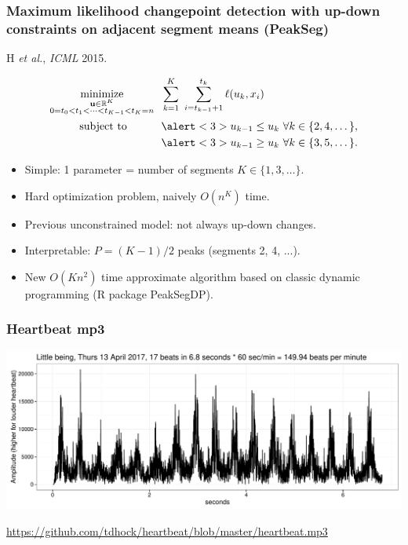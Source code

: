\documentclass{beamer}
\DeclareMathOperator*{\minimize}{minimize}
\newcommand{\RR}{\mathbb R}
\begin{document}
\begin{frame}
  \frametitle{Maximum likelihood changepoint detection with up-down constraints on adjacent segment means (PeakSeg)}
H {\it et al.}, {\it ICML} 2015. 
   
\vskip -1.5cm
\begin{align*}
    \minimize_{\substack{
  \mathbf u\in\RR^{K}
\\
   0=t_0<t_1<\cdots<t_{K-1}<t_K=n
  }} &\ \ 
    \sum_{k=1}^K\  \sum_{i=t_{k-1}+1}^{t_k} \ell( u_k,  x_i) 
  \label{PeakSegPDPA}
\\
      \text{subject to \hskip 0.75cm} &\ \ \alert<3>{u_{k-1} \leq u_k\ \forall k\in\{2,4,\dots\},}
  \nonumber\\
  &\ \ \alert<3>{u_{k-1} \geq u_k\ \forall k\in\{3,5,\dots\}.}
  \nonumber 
\end{align*}
\vskip -0.4cm
\begin{itemize}  
\item Simple: 1 parameter = number of segments $K\in\{1,3,\dots\}$.
\item Hard optimization problem, naively $O(n^K)$ time.
\item \alert<2>{Previous unconstrained model: not always up-down changes.}
\item \alert<3>{Interpretable: $P=(K-1)/2$ peaks (segments 2, 4, ...).}
\item New $O(Kn^2)$ time approximate algorithm based on classic
  dynamic programming (R package PeakSegDP).
\end{itemize}
\end{frame} 

\begin{frame}
  \frametitle{Heartbeat mp3}
  \includegraphics[width=\textwidth]{figure-heartbeat-data-only}

  \scriptsize
  \url{https://github.com/tdhock/heartbeat/blob/master/heartbeat.mp3}
\end{frame}
\end{document}
